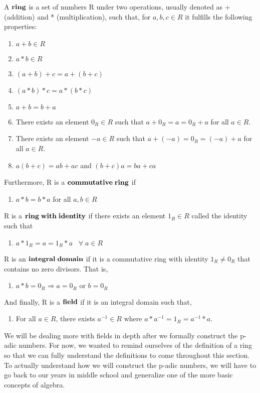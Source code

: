 \documentclass[a4paper]{article}
\begin{document}
\begin{definition}[Rings]
  A \(\bf{ring}\) is a set of numbers R under two operations,
  usually denoted as + (addition) and * (multiplication), such that, for
  $a,b,c\in R$ it fulfills the following properties:
  \begin{enumerate}[series=ring]
	\item $a+b\in R$
    \item $a*b\in R$
    \item $(a+b)+c=a+(b+c)$
    \item $(a*b)*c=a*(b*c)$
    \item $a+b=b+a$
    \item There exists an element $0_R\in R$ such that $a+0_R=a=0_R+a$ for 
    	all $a\in R$.
    \item There exists an element $-a\in R$ such that $a+(-a)=0_R=(-a)+a$
    	for all $a\in R$.
    \item $a(b+c)=ab+ac$ and $(b+c)a=ba+ca$
  \end{enumerate}
  Furthermore, R is a \(\bf{commutative\;ring}\) if 
  \begin{enumerate}[resume=ring]
	\item $a*b=b*a$ for all $a,b\in R$
  \end{enumerate}
  R is a $\bf{ring\;with\;identity}$ if there exists an element $1_R\in R$ called 
  the identity such that
  \begin{enumerate}[resume=ring]
    \item $a*1_R=a=1_R*a\;\;\;\forall\;a\in R$
  \end{enumerate}
  R is an $\bf{integral\;domain}$ if it is a commutative ring with identity 
  $1_R\neq 0_R$ that contains no zero divisors.  That is,
  \begin{enumerate}[resume=ring]
    \item $a*b=0_R\Rightarrow a=0_R\text{ or }b=0_R$
  \end{enumerate}
  And finally, R is a \(\bf{field}\) if it is an integral domain such that, 
  \begin{enumerate}[resume=ring]
    \item For all $a\in R$, there exists $a^{-1}\in R$ where 
    $a*a^{-1}=1_R=a^{-1}*a$.
  \end{enumerate}
\end{definition}

We will be dealing more with fields in depth after we formally construct
the p-adic numbers.  For now, we wanted to remind ourselves of the
definition of a ring so that we can fully understand the definitions to
come throughout this section.  To actually understand how we will
construct the p-adic numbers, we will have to go back to our years in
middle school and generalize one of the more basic concepts of algebra.
\end{document}
